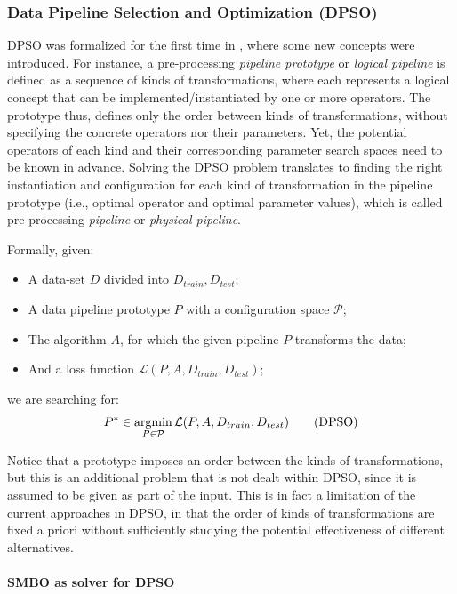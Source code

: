 \subsubsection{Data Pipeline Selection and Optimization (DPSO)}

DPSO was formalized for the first time in \cite{Quemy20InfSystems}, where some new concepts were introduced. For instance, a pre-processing \textit{pipeline prototype} or \textit{logical pipeline} is defined as a sequence of kinds of transformations, where each represents a logical concept that can be implemented/instantiated by one or more operators. The prototype thus, defines only the order between kinds of transformations, without specifying the concrete operators nor their parameters. Yet, the potential operators of each kind and their corresponding parameter search spaces need to be known in advance. Solving the DPSO problem translates to finding the right instantiation and configuration for each kind of transformation in the pipeline prototype (i.e., optimal operator and optimal parameter values), which is called pre-processing \textit{pipeline} or \textit{physical pipeline}. 

Formally, given:
\begin{itemize}
    \item A data-set $D$ divided into $D_{train}, D_{test}$;
    \item A data pipeline prototype $P$ with a configuration space  $\mathcal{P}$;
    \item The algorithm $A$, for which the given pipeline $P$ transforms the data;
    \item And a loss function $\mathcal{L}(P,A,D_{train},D_{test})$;
\end{itemize}
we are searching for:
\begin{equation}
    P^\ast \in \mathop{\mathrm{argmin}}_{P \in \mathcal{P}} \mathcal{L}(P,A,D_{train},D_{test}) \tag{DPSO}
\end{equation}

Notice that a prototype imposes an order between the kinds of transformations, but this is an additional problem that is not dealt within DPSO, since it is assumed to be given as part of the input. This is in fact a limitation of the current approaches in DPSO, in that the order of kinds of transformations are fixed a priori without sufficiently studying the potential effectiveness of different alternatives.

\paragraph{SMBO as solver for DPSO}

